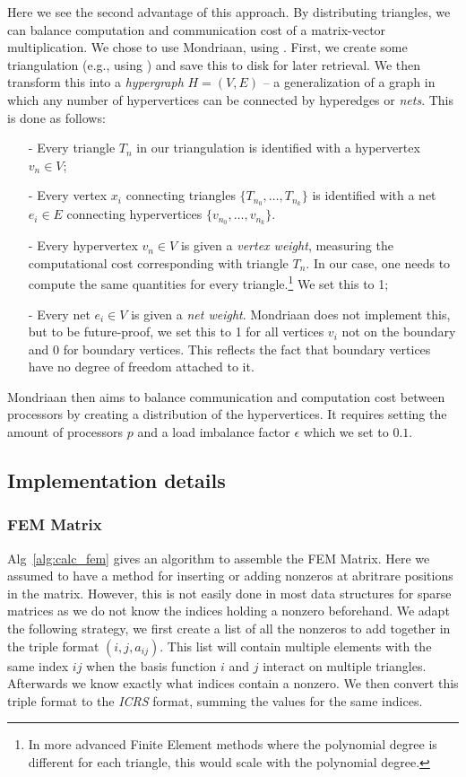 \documentclass[11pt]{amsart}
\theoremstyle{definition}
\begin{document}
Here we see the second advantage of this approach. By distributing triangles, we can balance computation and communication cost of a matrix-vector multiplication. We chose to use Mondriaan, using \cite{bissmondriaan,biss2012}. First, we create some triangulation (e.g., using \cite{TODOJAN}) and save this to disk for later retrieval. We then transform this into a \emph{hypergraph} $H = (V,E)$ -- a generalization of a graph in which any number of hypervertices can be connected by hyperedges or \emph{nets}. This is done as follows:
\begin{itemize}
  \item[-] Every triangle $T_n$ in our triangulation is identified with a hypervertex $v_n \in V$;
  \item[-] Every vertex $x_i$ connecting triangles $\{T_{n_0}, \ldots, T_{n_k}\}$ is identified with a net $e_i \in E$ connecting hypervertices $\{v_{n_0}, \ldots, v_{n_k}\}$.
  \item[-] Every hypervertex $v_n \in V$ is given a \emph{vertex weight}, measuring the computational cost corresponding with triangle $T_n$. In our case, one needs to compute the same quantities for every triangle.\footnote{In more advanced Finite Element methods where the polynomial degree is different for each triangle, this would scale with the polynomial degree.} We set this to 1;
  \item[-] Every net $e_i\in V$ is given a \emph{net weight}. Mondriaan does not implement this, but to be future-proof, we set this to 1 for all vertices $v_i$ not on the boundary and 0 for boundary vertices. This reflects the fact that boundary vertices have no degree of freedom attached to it.
\end{itemize}
Mondriaan then aims to balance communication and computation cost between processors by creating a distribution of the hypervertices. It requires setting the amount of processors $p$ and a load imbalance factor $\epsilon$ which we set to $0.1$.

\subsection{Implementation details}
\subsubsection{FEM Matrix}
Alg~\ref{alg:calc_fem} gives an algorithm to assemble the FEM Matrix. Here
we assumed to have a method for inserting or adding nonzeros at abritrare positions in the matrix. However,
this is not easily done in most data structures for sparse matrices as we do not know the
indices holding a nonzero beforehand. We adapt the following strategy, we first create a list
of all the nonzeros to add together in the triple format $(i,j,a_{ij})$.
This list will contain multiple elements with the same index $ij$ when
the basis function $i$ and $j$ interact on multiple triangles. Afterwards we know
exactly what indices contain a nonzero. We then convert this triple format to the \emph{ICRS}
\cite[p.~171]{biss04} format, summing the values for the same indices.
\end{document}
